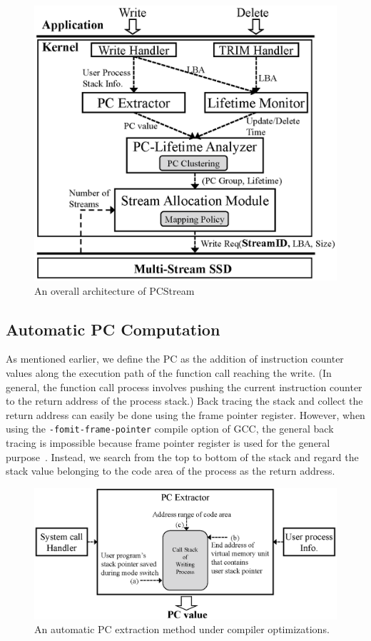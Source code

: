 \begin{figure}[t]
	\centering
	\includegraphics[width=0.8\linewidth]{figure/architecture2}
	\caption{An overall architecture of {\sf PCStream}}
	\label{fig:architecture}
	\vspace{-20pt}
\end{figure}

\subsection{Automatic PC Computation}
As mentioned earlier, we define the PC as the addition of instruction counter values along the 
execution path of the function call reaching the write. 
(In general, the function call process involves pushing the current instruction 
counter to the return address of the process stack.) 
Back tracing the stack and collect the return address can easily be done using the frame pointer register. 
However, when using the {\tt -fomit-frame-pointer} compile option of GCC, 
the general back tracing is impossible because frame pointer register is used for the general purpose~\cite{GCC}. 
Instead, we search from the top to bottom of the stack and regard the stack value 
belonging to the code area of the process as the return address. 

\begin{figure}[t]
	\centering
	\includegraphics[width=1\linewidth]{figure/getpc}
	\vspace{-10pt}
	\caption{An automatic PC extraction method under compiler optimizations.}
	\label{fig:getpc}
	\vspace{-20pt}
\end{figure}

